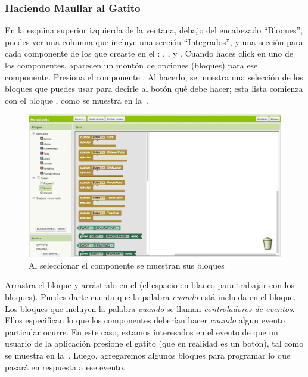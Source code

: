 \documentclass[letterpaper]{article}
\begin{document}
\subsubsection*{Haciendo Maullar al Gatito}

En la esquina superior izquierda de la ventana, debajo del encabezado
``Bloques'', puedes ver una columna que incluye una sección
``Integrados'', y una sección para cada componente de los que creaste
en el \designer: , , y
. Cuando haces click en uno de los componentes,
aparecen un montón de opciones (bloques) para ese componente. Presiona
el componente . Al hacerlo, se muestra una selección
de los bloques que puedes usar para decirle al botón qué debe hacer;
esta lista comienza con el bloque , como se
muestra en la~.

\begin{figure}[H]
\centering
\includegraphics[scale=0.25]{figures/button1Blocks}
\caption{Al seleccionar el componente  se muestran
  sus bloques}
\label{fig:button1Blocks}
\end{figure}

Arrastra el bloque  y arrástralo en el \viewer (el
espacio en blanco para trabajar con los bloques). Puedes darte cuenta
que la palabra \emph{cuando} está incluida en el bloque. Los bloques
que incluyen la palabra \emph{cuando} se llaman \emph{controladores de
  eventos}. Ellos especifican lo que los componentes deberían hacer
\emph{cuando} algun evento particular ocurre. En este caso, estamos
interesados en el evento de que un usuario de la aplicación presione
el gatito (que en realidad es un botón), tal como se muestra en
la~. Luego, agregaremos algunos bloques
para programar lo que pasará en respuesta a ese evento.
\end{document}
